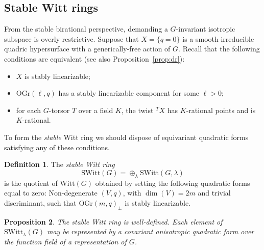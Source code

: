 \documentclass[12pt]{amsart}
\numberwithin{equation}{section}
\newcommand{\OGr}{\mathrm{OGr}}
\newcommand{\SWitt}{\mathrm{SWitt}}
\newcommand{\Witt}{\mathrm{Witt}}
\theoremstyle{plain}
\newtheorem{prop}{Proposition}[section]
\theoremstyle{definition}
\newtheorem{defi}[prop]{Definition}
\theoremstyle{remark}
\begin{document}
\subsection*{Stable Witt rings}
From the stable birational perspective, demanding a $G$-invariant
isotropic subspace is overly restrictive. Suppose that
$X=\{q=0\}$ is a smooth irreducible quadric hypersurface
with a generically-free action of $G$. Recall
\cite[\S 10]{DR} that the following conditions are
equivalent (see also Proposition~\ref{prop:dr}):
\begin{itemize}
\item{$X$ is stably linearizable;}
\item{$\OGr(\ell,q)$ has a stably linearizable component for some $\ell> 0$;}
\item{for each $G$-torsor $T$ over a field $K$, the twist 
${ }^TX$ has $K$-rational points and is $K$-rational.}
\end{itemize}
To form the {\em stable} Witt ring we should
dispose of equivariant quadratic forms satisfying any of these
conditions. 
\begin{defi}
The {\em stable Witt ring} 
$$\SWitt(G) = \oplus_{\lambda} \SWitt(G,\lambda)$$
is the quotient of $\Witt(G)$ obtained by 
setting the following quadratic forms equal to zero: Non-degenerate $(V,q)$, with $\dim(V)=2m$ and trivial
discriminant, such that $\OGr(m,q)_{\pm}$ is
stably linearizable.  
\end{defi}
\begin{prop}
The stable Witt ring is well-defined. Each element
of $\SWitt_{\lambda}(G)$ may be represented by a 
covariant anisotropic quadratic form over the function 
field of a representation of $G$.
\end{prop}
\end{document}
